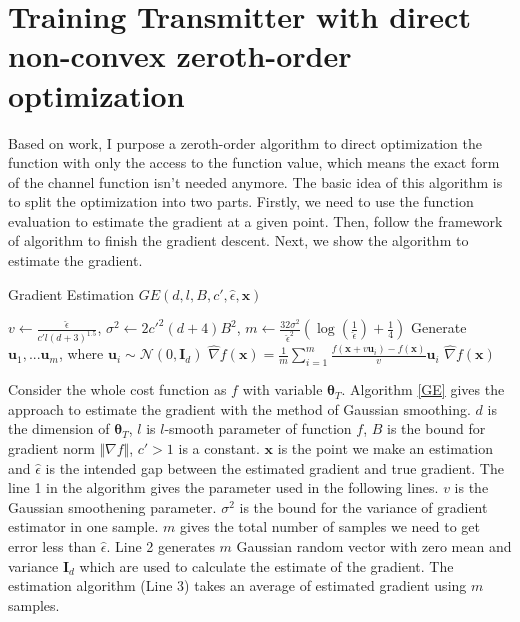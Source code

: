 \documentclass[12pt,a4paper]{article}
\begin{document}
	\section{Training Transmitter with direct non-convex zeroth-order optimization}
	\noindent
	\par Based on \cite{jin2017escape} work, I purpose a zeroth-order algorithm \citep{2019arXiv191001277B} to direct optimization the function with only the access to the function value, which means the exact form of the channel function isn't needed anymore. The basic idea of this algorithm is to split the optimization into two parts. Firstly, we need to use the function evaluation to estimate the gradient at a given point. Then, follow the framework of \cite{jin2017escape} algorithm to finish the gradient descent. Next, we show the algorithm to estimate the gradient.
	\begin{algorithm}[h]
		\label{GE}
		\caption{Gradient Estimation $GE({d,l,B,c',\hat{\epsilon},\bm{x}})$}
		\begin{algorithmic}[1]
			\State $v\leftarrow\frac{\hat{\epsilon}}{c'l(d+3)^{1.5}}$, $\sigma^2\leftarrow2c'^{2}(d+4)B^2$, $m\leftarrow\frac{32\sigma^2}{\hat{\epsilon}^2}(\log(\frac{1}{\hat{\epsilon}})+\frac{1}{4})$
			\State Generate $\bm{u}_1,...\bm{u}_m$, where $\bm{u}_i\sim\mathcal{N}(0,\mathbf{I}_d)$
			\State $\hat{\nabla}f(\bm{x})=\frac{1}{m}\sum_{i=1}^{m}\frac{f(\bm{x}+v\bm{u}_i)-f(\bm{x})}{v}\bm{u}_i$ 
			\State \Return $\hat{\nabla}f(\bm{x})$
		\end{algorithmic}
	\end{algorithm}
	\par Consider the whole cost function as $f$ with variable $\bm{\theta}_T$. Algorithm  \ref{GE} gives the approach to estimate the gradient with the method of Gaussian smoothing. $d$ is the dimension of $\bm{\theta}_T$,  $l$ is $l$-smooth parameter of function $f$, $B$ is the bound for gradient norm $\Vert \nabla f\Vert$, $c'>1$ is a constant. $\bm{x}$ is the point we make an estimation and $\hat{\epsilon}$ is the intended gap between the estimated gradient and true gradient. The line 1 in the algorithm gives the parameter used in the following lines. $v$ is the Gaussian smoothening parameter. $\sigma^2$ is the bound for the variance of gradient estimator in one sample. $m$ gives the total number of samples we need to get error less than $\hat{\epsilon}$. Line 2 generates $m$ Gaussian random vector with zero mean and variance $\mathbf{I}_d$ which are used to calculate the estimate of the gradient. The estimation algorithm (Line 3) takes an average of estimated gradient using $m$ samples. 
\end{document}
